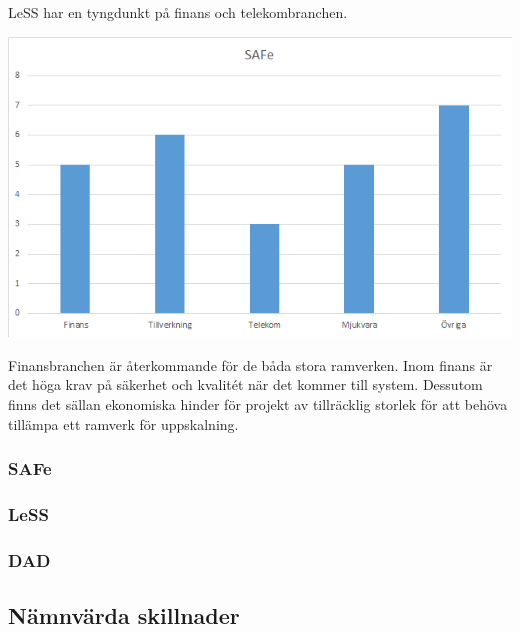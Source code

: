 		LeSS har en tyngdunkt på finans och telekombranchen.
			
		\begin{center}
			\includegraphics{Grafer/SAFe_brancher.png}
		\end{center}
		
		
		
		Finansbranchen är återkommande för de båda stora ramverken. Inom finans är det höga krav på säkerhet och kvalitét när det kommer till system. Dessutom finns det sällan ekonomiska hinder för projekt av tillräcklig storlek för att behöva tillämpa ett ramverk för uppskalning. 
		
		
		
	
	\subsubsection{SAFe}	
		
	\subsubsection{LeSS}
		
	\subsubsection{DAD}
		
	\subsection{Nämnvärda skillnader}